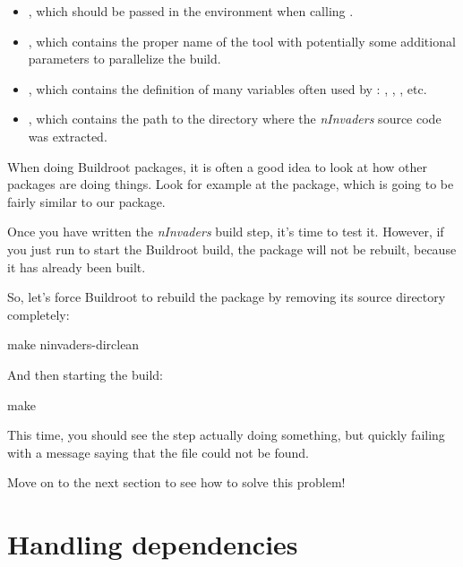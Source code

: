 \begin{itemize}

\item {}, which should be passed in the
  environment when calling .

\item {}, which contains the proper name of the 
  tool with potentially some additional parameters to parallelize the
  build.

\item {}, which contains the definition of
  many variables often used by : ,
  , , etc.

\item {}, which contains the path to the directory where the
  {\em nInvaders} source code was extracted.

\end{itemize}

When doing Buildroot packages, it is often a good idea to look at how
other packages are doing things. Look for example at the 
package, which is going to be fairly similar to our 
package.

Once you have written the {\em nInvaders} build step, it's time to
test it. However, if you just run  to start the Buildroot
build, the  package will not be rebuilt, because it
has already been built.

So, let's force Buildroot to rebuild the package by removing its
source directory completely:

\begin{bashinput}
make ninvaders-dirclean
\end{bashinput}

And then starting the build:

\begin{bashinput}
make
\end{bashinput}

This time, you should see the  step
actually doing something, but quickly failing with a message saying
that the  file could not be found.

Move on to the next section to see how to solve this problem!

\section{Handling dependencies}

